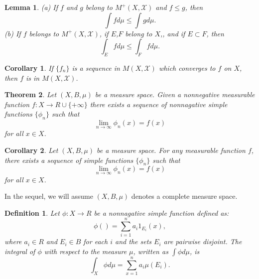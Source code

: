 \documentclass[12pt]{amsart}
\newtheorem{definition}{Definition}
\theoremstyle{plain}
\newtheorem{thm}{Theorem}[section]
\newtheorem{lemma}[thm]{Lemma}
\newtheorem{cor}{Corollary}[thm]
\theoremstyle{definition}
\theoremstyle{remark}
\numberwithin{equation}{section}
\numberwithin{thm}{section}
\begin{document}
\begin{lemma} \label{lem:4.5Bartle}
    (a) If $f$ and $g$ belong to $M^+(X,\mathcal{X})$ and $f \leq g$, then
    \begin{equation*}
        \int f d\mu \leq \int g d\mu.
    \end{equation*}
    (b) If $f$ belongs to $M^+(X,\mathcal{X})$, if $E$,$F$ belong to $X$,, and if $E \subset F$, then
    \begin{equation*}
        \int_E f d\mu \leq \int_F f d\mu.
    \end{equation*}
\end{lemma}
\begin{cor} \label{cor:2.10Bartle}
    If $\{f_n \}$ is a sequence in $M(X,\mathcal{X})$ which converges to $f$ on $X$, then $f$ is in $M(X,\mathcal{X})$.
\end{cor}
\begin{thm}
    Let $(X,B,\mu)$ be a measure space. Given a nonnegative measurable function $f : X \to R \cup \{ +\infty \}$ there exists a sequence of nonnagative simple functions $\{\phi_n \}$ such that
    \begin{equation*}
        \lim_{n \to \infty} \phi_n(x) = f(x)
    \end{equation*}
for all $x \in X$.
\end{thm}

\begin{cor}
    Let $(X,B,\mu)$ be a measure space. For any measurable function $f$, there exists a sequence of simple functions $\{\phi_n \}$ such that
    \begin{equation*}
        \lim_{n \to \infty} \phi_n(x) = f(x)
    \end{equation*}
for all $x \in X$.
\end{cor}
 
In the sequel, we will assume $(X,B,\mu)$ denotes a complete measure space.
\begin{definition}
    Let $\phi: X \to R$ be a nonnagative simple function defined as:
    \begin{equation*}
        \phi() = \sum_{i=1}^n a_i 1_{E_i}(x),
    \end{equation*}
   where $a_i \in R$ and $E_i \in B$ for each $i$ and the sets $E_i$ are pairwise disjoint. The integral of $\phi$ with respect to the measure $\mu$, written as $\int \phi d\mu$, is
   \begin{equation*}
       \int_X \phi d\mu = \sum_{x=1}^n a_i \mu(E_i).
   \end{equation*}
\end{definition}
\end{document}
